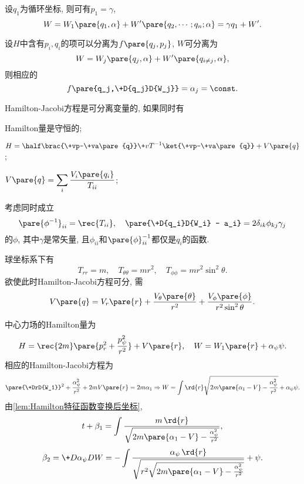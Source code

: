 \documentclass[../TheoreticalMechanics.tex]{subfiles}
\begin{document}
\begin{lemma}[有循环坐标的Hamilton特征函数]
    设$q_1$为循环坐标, 则可有$p_1=\gamma$,
    \[ W = W_1\pare{q_1,\alpha} + W'\pare{q_2,\cdots;q_n;\alpha} = \gamma q_1 + W'. \]
\end{lemma}
\begin{finale}
    \begin{theorem}[分离变量法]
        设$H$中含有$p_i, q_i$的项可以分离为$f\pare{q_j,p_j}$, $W$可分离为
        \[ W = W_j\pare{q_j,\alpha} + W'\pare{q_{i\neq j},\alpha}, \]
        则相应的
        \[ f\pare{q_j,\+D{q_j}D{W_j}} = \alpha_j = \const. \]
    \end{theorem}
\end{finale}
\begin{theorem}[St\"ackel条件]
    Hamilton-Jacobi方程是可分离变量的, 如果同时有
    \begin{cenum}
        \item Hamilton量是守恒的;
        \item $\displaystyle H = \half\brac{\+vp-\+va\pare{q}}\+vT^{-1}\ket{\+vp-\+va\pare{q}} + V\pare{q}$;
        \item $\displaystyle V\pare{q} = \sum_i \frac{V_i\pare{q_i}}{T_{ii}}$;
        \item 考虑同时成立
        \[ \pare{\phi^{-1}}_{ii} = \rec{T_{ii}},\quad \pare{\+D{q_i}D{W_i} - a_i} = 2\delta_{ik}\phi_{kj}\gamma_j \]
        的$\phi$, 其中$\gamma$是常矢量, 且$\phi_{ii}$和$\pare{\phi}^{-1}_{ii}$都仅是$q_i$的函数.
    \end{cenum}
\end{theorem}
\begin{corollary}[球坐标系下可分的条件]
    球坐标系下有
    \[ T_{rr} = m,\quad T_{\theta\theta} = mr^2,\quad T_{\phi\phi} = mr^2\sin^2\theta. \]
    欲使此时Hamilton-Jacobi方程可分, 需
    \[ V\pare{q} = V_r\pare{r} + \frac{V_\theta\pare{\theta}}{r^2} + \frac{V_\phi\pare{\phi}}{r^2\sin^2\theta}.  \]
\end{corollary}
\begin{ex}[中心力场问题]
    中心力场的Hamilton量为
    \[ H = \rec{2m}\pare{p_r^2 + \frac{p_\psi^2}{r^2}}+V\pare{r},\quad W = W_1\pare{r} + \alpha_\psi \psi. \]
    相应的Hamilton-Jacobi方程为
    \[ \pare{\+DrD{W_1}}^2 + \frac{\alpha_\psi^2}{r^2} + 2mV\pare{r} = 2m\alpha_1\Rightarrow W = \int\rd{r}\sqrt{2m\pare{\alpha_1-V}-\frac{\alpha_\psi^2}{r^2}}+\alpha_\psi\psi. \]
    由\cref{lem:Hamilton特征函数变换后坐标},
    \[ t+\beta_1 = \int \frac{m\,\rd{r}}{\sqrt{2m\pare{\alpha_1-V} - \frac{\alpha_\psi^2}{r^2}}}, \]
    \[ \beta_2 = \+D{\alpha_\psi}DW = -\int \frac{\alpha_\psi\,\rd{r}}{\sqrt{r^2\sqrt{2m\pare{\alpha_1 - V} - \frac{\alpha_\psi^2}{r^2}}}} + \psi. \]
\end{ex}
\end{document}
